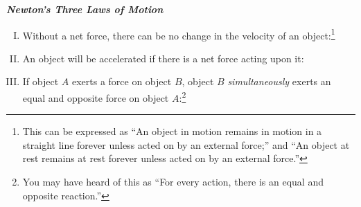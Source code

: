 \begin{reading}
\textbf{\textit{Newton's Three Laws of Motion}}

\begin{enumerate}[I.]
	\item Without a net force, there can be no change in the velocity of an object:\footnote{This can be expressed as ``An object in motion remains in motion in a straight line forever unless acted on by an external force;'' and ``An object at rest remains at rest forever unless acted on by an external force.''}
	
	\begin{center}\end{center}
	
	\item An object will be accelerated if there is a net force acting upon it:
	
	\begin{center}\end{center}

	\item If object $A$ exerts a force on object $B$, object $B$ \emph{simultaneously} exerts an equal and opposite force on object $A$:\footnote{You may have heard of this as ``For every action, there is an equal and opposite reaction.''}
	
	\begin{center}\end{center}
	
\end{enumerate}

\end{reading}

